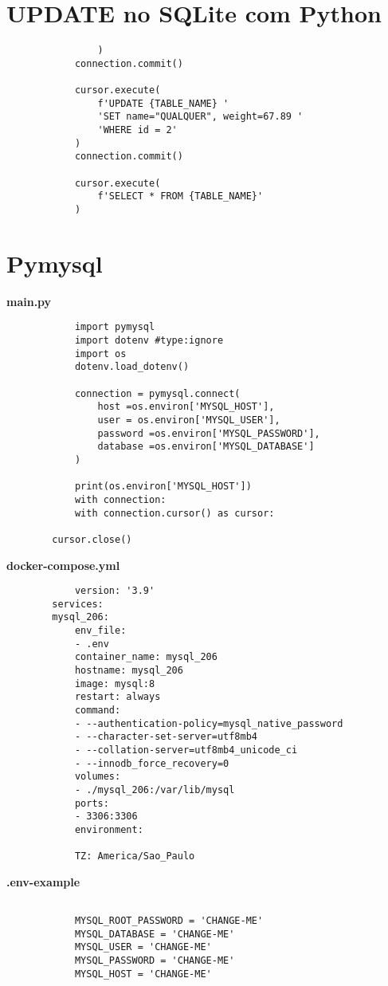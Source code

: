 \documentclass{article}
\begin{document}
    \section{UPDATE no SQLite com Python}
        \begin{lstlisting}
                )
            connection.commit()

            cursor.execute(
                f'UPDATE {TABLE_NAME} '
                'SET name="QUALQUER", weight=67.89 '
                'WHERE id = 2'
            )
            connection.commit()

            cursor.execute(
                f'SELECT * FROM {TABLE_NAME}'
            )

        \end{lstlisting}
        \section{Pymysql}
    
        \textbf{main.py}
        \begin{lstlisting}
            import pymysql
            import dotenv #type:ignore
            import os
            dotenv.load_dotenv()

            connection = pymysql.connect(
                host =os.environ['MYSQL_HOST'],
                user = os.environ['MYSQL_USER'],
                password =os.environ['MYSQL_PASSWORD'],
                database =os.environ['MYSQL_DATABASE']
            )

            print(os.environ['MYSQL_HOST'])
            with connection:
            with connection.cursor() as cursor:

        cursor.close()

        \end{lstlisting}  
        
        \textbf{docker-compose.yml}
        \begin{lstlisting}
            version: '3.9'
        services:
        mysql_206:
            env_file:
            - .env
            container_name: mysql_206
            hostname: mysql_206
            image: mysql:8
            restart: always
            command:
            - --authentication-policy=mysql_native_password
            - --character-set-server=utf8mb4
            - --collation-server=utf8mb4_unicode_ci
            - --innodb_force_recovery=0
            volumes:
            - ./mysql_206:/var/lib/mysql
            ports:
            - 3306:3306
            environment:
            
            TZ: America/Sao_Paulo
        \end{lstlisting} 
        \textbf{.env-example} 
        \begin{lstlisting}

            MYSQL_ROOT_PASSWORD = 'CHANGE-ME'
            MYSQL_DATABASE = 'CHANGE-ME'
            MYSQL_USER = 'CHANGE-ME'
            MYSQL_PASSWORD = 'CHANGE-ME'
            MYSQL_HOST = 'CHANGE-ME'
        \end{lstlisting}    
\end{document}
